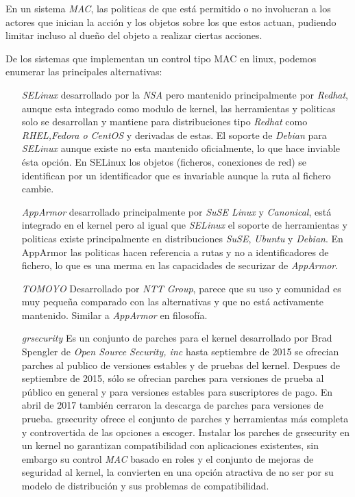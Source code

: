 En un sistema \emph{MAC}, las politicas de que está permitido o no involucran a los actores que inician la acción y los objetos sobre los que estos actuan, pudiendo
limitar incluso al dueño del objeto a realizar ciertas acciones.

De los sistemas que implementan un control tipo MAC en linux, podemos enumerar las principales alternativas:

\begin{itemize}
    \item[\emph{SELinux}] desarrollado por la \emph{NSA} pero mantenido principalmente por \emph{Redhat}, aunque esta integrado como modulo de kernel,
    las herramientas y politicas solo se desarrollan y mantiene para distribuciones tipo \emph{Redhat} como \emph{RHEL,Fedora o CentOS} y derivadas de estas.
    El soporte de \emph{Debian} para \emph{SELinux} aunque existe no esta mantenido oficialmente, lo que hace inviable ésta opción. En SELinux los objetos (ficheros, conexiones de red) se identifican por
    un identificador que es invariable aunque la ruta al fichero cambie. 
    \item[\emph{AppArmor}] desarrollado principalmente por \emph{SuSE Linux} y \emph{Canonical}, está integrado en el kernel pero al igual que \emph{SELinux} 
    el soporte de herramientas y politicas existe principalmente en distribuciones \emph{SuSE}, \emph{Ubuntu} y \emph{Debian}. En AppArmor las politicas hacen referencia a rutas y no 
    a identificadores de fichero, lo que es una merma en las capacidades de securizar de \emph{AppArmor}.
    \item[\emph{TOMOYO}] Desarrollado por \emph{NTT Group}, parece que su uso y comunidad es muy pequeña comparado con las alternativas y que no está activamente mantenido. Similar a \emph{AppArmor} en filosofía.
    \item[\emph{grsecurity}] Es un conjunto de parches para el kernel desarrollado por Brad Spengler de \emph{Open Source Security, inc} hasta septiembre de 2015 se ofrecian parches al publico de versiones estables y de pruebas del kernel. 
    Despues de septiembre de 2015, sólo se ofrecian parches para versiones de prueba al público en general y para versiones estables para suscriptores de pago. En abril de 2017 también cerraron la descarga de parches
    para versiones de prueba. grsecurity ofrece el conjunto de parches y herramientas más completa y controvertida de las opciones a escoger. Instalar los parches de grsecurity en un kernel
    no garantizan compatibilidad con aplicaciones existentes, sin embargo su control \emph{MAC} basado en roles y el conjunto de mejoras de seguridad al kernel, la convierten en una opción atractiva de no ser por su modelo de distribución y sus problemas de compatibilidad.
\end{itemize}

